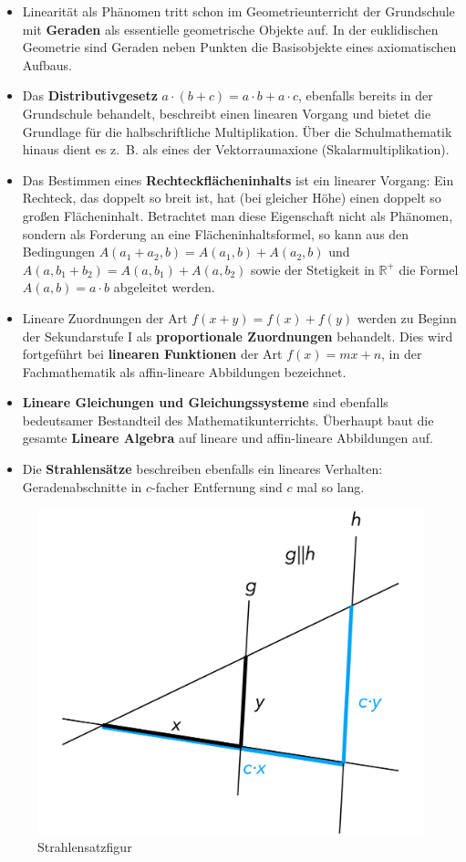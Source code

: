 \documentclass[
  ngerman,
]{scrbook}
\providecommand{\tightlist}{%
  \setlength{\itemsep}{0pt}\setlength{\parskip}{0pt}}
\theoremstyle{definition}
\theoremstyle{definition}
\theoremstyle{definition}
\theoremstyle{definition}
\theoremstyle{remark}
\begin{document}
\begin{itemize}
\tightlist
\item
  Linearität als Phänomen tritt schon im Geometrieunterricht der Grundschule mit \textbf{Geraden} als essentielle geometrische Objekte auf. In der euklidischen Geometrie sind Geraden neben Punkten die Basisobjekte eines axiomatischen Aufbaus.
\item
  Das \textbf{Distributivgesetz} \(a\cdot (b+c) = a\cdot b + a\cdot c\), ebenfalls bereits in der Grundschule behandelt, beschreibt einen linearen Vorgang und bietet die Grundlage für die halbschriftliche Multiplikation. Über die Schulmathematik hinaus dient es z.~B. als eines der Vektorraumaxione (Skalarmultiplikation).
\item
  Das Bestimmen eines \textbf{Rechteckflächeninhalts} ist ein linearer Vorgang: Ein Rechteck, das doppelt so breit ist, hat (bei gleicher Höhe) einen doppelt so großen Flächeninhalt. Betrachtet man diese Eigenschaft nicht als Phänomen, sondern als Forderung an eine Flächeninhaltsformel, so kann aus den Bedingungen \(A(a_1+a_2,b) = A(a_1,b) + A(a_2,b)\) und \(A(a,b_1+b_2) = A(a,b_1)+A(a,b_2)\) sowie der Stetigkeit in \(\mathbb{R}^+\) die Formel \(A(a,b) = a\cdot b\) abgeleitet werden.
\item
  Lineare Zuordnungen der Art \(f(x+y) = f(x)+f(y)\) werden zu Beginn der Sekundarstufe I als \textbf{proportionale Zuordnungen} behandelt. Dies wird fortgeführt bei \textbf{linearen Funktionen} der Art \(f(x) = mx+n\), in der Fachmathematik als affin-lineare Abbildungen bezeichnet.
\item
  \textbf{Lineare Gleichungen und Gleichungssysteme} sind ebenfalls bedeutsamer Bestandteil des Mathematikunterrichts. Überhaupt baut die gesamte \textbf{Lineare Algebra} auf lineare und affin-lineare Abbildungen auf.
\item
  Die \textbf{Strahlensätze} beschreiben ebenfalls ein lineares Verhalten: Geradenabschnitte in \(c\)-facher Entfernung sind \(c\) mal so lang.
\end{itemize}

\begin{figure}

{\centering \includegraphics[width=0.5\linewidth]{pictures/3-Strahlensatz} 

}

\caption{Strahlensatzfigur}\label{fig:Strahlensatz}
\end{figure}
\end{document}
